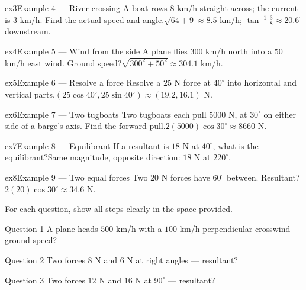 \documentclass[11pt]{article}
\begin{document}
\begin{example}{ex3}{Example 4 --- River crossing}
A boat rows $8$ km/h straight across; the current is $3$ km/h. Find the actual speed and angle.\soln $\sqrt{64+9}\approx8.5$ km/h; $\tan^{-1}\tfrac38\approx20.6^\circ$ downstream.
\end{example}

\begin{example}{ex4}{Example 5 --- Wind from the side}
A plane flies $300$ km/h north into a $50$ km/h east wind. Ground speed?\soln $\sqrt{300^2+50^2}\approx304.1$ km/h.
\end{example}

\begin{example}{ex5}{Example 6 --- Resolve a force}
Resolve a $25$ N force at $40^\circ$ into horizontal and vertical parts.\soln $(25\cos40^\circ,25\sin40^\circ)\approx(19.2,16.1)$ N.
\end{example}

\begin{example}{ex6}{Example 7 --- Two tugboats}
Two tugboats each pull $5000$ N, at $30^\circ$ on either side of a barge's axis. Find the forward pull.\soln $2(5000)\cos30^\circ\approx8660$ N.
\end{example}

\begin{example}{ex7}{Example 8 --- Equilibrant}
If a resultant is $18$ N at $40^\circ$, what is the equilibrant?\soln Same magnitude, opposite direction: $18$ N at $220^\circ$.
\end{example}

\begin{example}{ex8}{Example 9 --- Two equal forces}
Two $20$ N forces have $60^\circ$ between. Resultant?\soln $2(20)\cos30^\circ\approx34.6$ N.
\end{example}

\clearpage
{}
For each question, show all steps clearly in the space provided.

\begin{qbox}{Question 1}
A plane heads $500$ km/h with a $100$ km/h perpendicular crosswind — ground speed?\workspace{2.4cm}
\end{qbox}

\begin{qbox}{Question 2}
Two forces $8$ N and $6$ N at right angles — resultant?\workspace{2.4cm}
\end{qbox}

\begin{qbox}{Question 3}
Two forces $12$ N and $16$ N at $90^\circ$ — resultant?\workspace{2.4cm}
\end{qbox}
\end{document}

